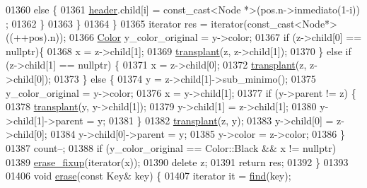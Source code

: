 \begin{DoxyCode}
01360                 \textcolor{keywordflow}{else} \{
01361                     \hyperlink{classaed2_1_1map_a92d93f905c8ad73fba18fdc7e8915cce_a92d93f905c8ad73fba18fdc7e8915cce}{header}.child[i] = \textcolor{keyword}{const\_cast<}Node *\textcolor{keyword}{>}(pos.n->inmediato(1-i))
      ;
01362                 \}
01363             \}
01364         \}
01365         iterator res = iterator(const\_cast<Node*>((++pos).n));
01366         \hyperlink{classaed2_1_1map_a6d62a415a4b9d320b30cada4ebcf9f5b_a6d62a415a4b9d320b30cada4ebcf9f5b}{Color} y\_color\_original = y->color;
01367         \textcolor{keywordflow}{if} (z->child[0] == \textcolor{keyword}{nullptr})\{
01368             x = z->child[1];
01369             \hyperlink{classaed2_1_1map_a98b9f200c64ce02dfb67902ee00e375a_a98b9f200c64ce02dfb67902ee00e375a}{transplant}(z, z->child[1]);
01370         \} \textcolor{keywordflow}{else} \textcolor{keywordflow}{if} (z->child[1] == \textcolor{keyword}{nullptr}) \{
01371             x = z->child[0];
01372             \hyperlink{classaed2_1_1map_a98b9f200c64ce02dfb67902ee00e375a_a98b9f200c64ce02dfb67902ee00e375a}{transplant}(z, z->child[0]);
01373         \} \textcolor{keywordflow}{else} \{
01374             y = z->child[1]->sub\_minimo();
01375             y\_color\_original = y->color;
01376             x = y->child[1];
01377             \textcolor{keywordflow}{if} (y->parent != z) \{
01378                 \hyperlink{classaed2_1_1map_a98b9f200c64ce02dfb67902ee00e375a_a98b9f200c64ce02dfb67902ee00e375a}{transplant}(y, y->child[1]);
01379                 y->child[1] = z->child[1];
01380                 y->child[1]->parent = y;
01381             \}
01382             \hyperlink{classaed2_1_1map_a98b9f200c64ce02dfb67902ee00e375a_a98b9f200c64ce02dfb67902ee00e375a}{transplant}(z, y);
01383             y->child[0] = z->child[0];
01384             y->child[0]->parent = y;
01385             y->color = z->color;
01386         \}
01387         count--;
01388         \textcolor{keywordflow}{if} (y\_color\_original == Color::Black && x != \textcolor{keyword}{nullptr})
01389             \hyperlink{classaed2_1_1map_a7870c8f26e82b00d0aeb2e9f331dfec6_a7870c8f26e82b00d0aeb2e9f331dfec6}{erase_fixup}(iterator(x));
01390         \textcolor{keyword}{delete} z;
01391         \textcolor{keywordflow}{return} res;
01392     \}
01393 
01406     \textcolor{keywordtype}{void} \hyperlink{classaed2_1_1map_ad8e796bf9c9c558e5ce6b61e116253fe_ad8e796bf9c9c558e5ce6b61e116253fe}{erase}(\textcolor{keyword}{const} Key& key) \{
01407         iterator it = \hyperlink{classaed2_1_1map_afd0fc1a8234888e61e0e615de7e245b8_afd0fc1a8234888e61e0e615de7e245b8}{find}(key);

\end{DoxyCode}
